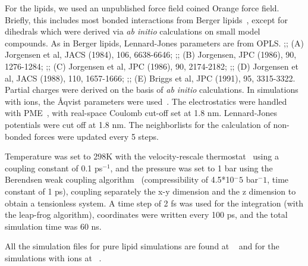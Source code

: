 \documentclass[pre,aps,floatfix,authordate1-4,twocolumn]{revtex4-1}
\begin{document}
For the lipids, we used an unpublished force field coined Orange force field. 
Briefly, this includes most bonded interactions from Berger lipids~\cite{berger97}, 
except for dihedrals which were derived via \textit{ab initio} calculations on small model compounds. 
As in Berger lipids, Lennard-Jones parameters are from OPLS.
;;    (A) Jorgensen et al, JACS (1984), 106, 6638-6646;
;;    (B) Jorgensen, JPC (1986), 90, 1276-1284;
;;    (C) Jorgensen et al, JPC (1986), 90, 2174-2182;
;;    (D) Jorgensen et al, JACS (1988), 110, 1657-1666;
;;    (E) Briggs et al, JPC (1991), 95, 3315-3322. 
Partial charges were derived on the basis of \textit{ab initio} calculations. 
In simulations with ions, the Åqvist parameters were used~\cite{aqvist90}. 
The electrostatics were handled with PME~\cite{darden93,essman95}, with real-space Coulomb cut-off set at 1.8 nm. 
Lennard-Jones potentials were cut off at 1.8 nm. 
The neighborlists for the calculation of non-bonded forces were updated every 5 steps.

Temperature was set to 298K with the velocity-rescale thermostat~\cite{bussi07} using a coupling constant of 0.1 ps$^{-1}$, and the pressure was set to 1 bar using the Berendsen weak coupling algorithm~\cite{berendsen84} (compressibility of 4.5*10$^-5$ bar$^-1$, time constant of 1 ps), coupling separately the x-y dimension and the z dimension to obtain a tensionless system. 
A time step of 2 fs was used for the integration (with the leap-frog algorithm), coordinates were written every 100 ps, 
and the total simulation time was 60 ns. 

All the simulation files for pure lipid simulations are found at ~\cite{zenodo links} and for the simulations with ions at ~\cite{zenodo links}.
\end{document}
